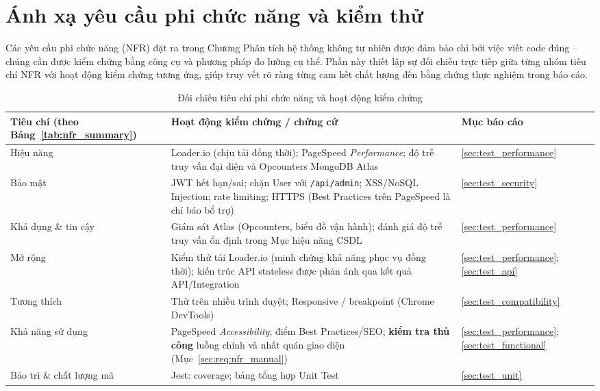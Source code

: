 \section{Ánh xạ yêu cầu phi chức năng và kiểm thử}
\label{sec:test_nfr_mapping}

Các yêu cầu phi chức năng (NFR) đặt ra trong Chương Phân tích hệ thống không tự nhiên được đảm bảo chỉ bởi việc viết code đúng -- chúng cần được kiểm chứng bằng công cụ và phương pháp đo lường cụ thể. Phần này thiết lập sự đối chiếu trực tiếp giữa từng nhóm tiêu chí NFR với hoạt động kiểm chứng tương ứng, giúp truy vết rõ ràng từng cam kết chất lượng đến bằng chứng thực nghiệm trong báo cáo.

\begin{table}[H]
\centering
\caption{Đối chiếu tiêu chí phi chức năng và hoạt động kiểm chứng}
\label{tab:nfr_test_mapping}
\small
\renewcommand{\arraystretch}{1.15}
\begin{tabular}{|p{3.3cm}|p{6.7cm}|p{3.8cm}|}
\hline
\textbf{Tiêu chí (theo Bảng~\ref{tab:nfr_summary})} & \textbf{Hoạt động kiểm chứng / chứng cứ} & \textbf{Mục báo cáo} \\
\hline
Hiệu năng &
Loader.io (chịu tải đồng thời); PageSpeed \textit{Performance}; độ trễ truy vấn đại diện và Opcounters MongoDB Atlas &
\ref{sec:test_performance} \\
\hline
Bảo mật &
JWT hết hạn/sai; chặn User với \texttt{/api/admin}; XSS/NoSQL Injection; rate limiting; HTTPS (Best Practices trên PageSpeed là chỉ báo bổ trợ) &
\ref{sec:test_security} \\
\hline
Khả dụng \& tin cậy &
Giám sát Atlas (Opcounters, biểu đồ vận hành); đánh giá độ trễ truy vấn ổn định trong Mục hiệu năng CSDL &
\ref{sec:test_performance} \\
\hline
Mở rộng &
Kiểm thử tải Loader.io (minh chứng khả năng phục vụ đồng thời); kiến trúc API stateless được phản ánh qua kết quả API/Integration &
\ref{sec:test_performance}; \ref{sec:test_api} \\
\hline
Tương thích &
Thử trên nhiều trình duyệt; Responsive / breakpoint (Chrome DevTools) &
\ref{sec:test_compatibility} \\
\hline
Khả năng sử dụng &
PageSpeed \textit{Accessibility}; điểm Best Practices/SEO; \textbf{kiểm tra thủ công} luồng chính và nhất quán giao diện (Mục~\ref{sec:req:nfr_manual}) &
\ref{sec:test_performance}; \ref{sec:test_functional} \\
\hline
Bảo trì \& chất lượng mã &
Jest: coverage; bảng tổng hợp Unit Test &
\ref{sec:test_unit} \\
\hline
\end{tabular}
\end{table}

